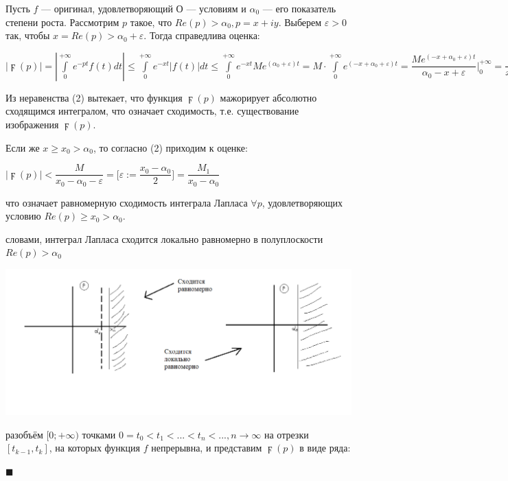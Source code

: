 \documentclass[a4paper, 12pt]{report}
\newenvironment{Proof}
{\par\noindent{\bf Доказательство.}}
{\hfill$\scriptstyle\blacksquare$}
\begin{document}
\begin{Proof}
    Пусть $f$ --- оригинал, удовлетворяющий О --- условиям и $\alpha_0$ --- его показатель степени роста. Рассмотрим $p$ такое, что $Re(p) > \alpha_0, p = x + iy$. Выберем $\varepsilon > 0$ так, чтобы $x = Re(p) > \alpha_0 + \varepsilon$. Тогда справедлива оценка:

$|\digamma(p)| = |\int\limits_0^{+\infty} e^{-pt}f(t)dt| \leq \int\limits_0^{+\infty} e^{-xt}|f(t)|dt \leq \int\limits_0^{+\infty} e^{-xt}Me^{(\alpha_0 + \varepsilon)t} = M\cdot\int\limits_0^{+\infty} e^{(-x + \alpha_0 + \varepsilon)t} = \dfrac{Me^{(-x + \alpha_0 + \varepsilon)t}}{\alpha_0 - x + \varepsilon}\Bigr|_0^{+\infty} = \dfrac{M}{x - \alpha_0 - \varepsilon} (2)$
\par\bigskip
Из неравенства (2) вытекает, что функция $\digamma(p)$ мажорирует абсолютно сходящимся интегралом, что означает сходимость, т.е. существование изображения $\digamma(p)$.

Если же $x \geq x_0 > \alpha_0$, то согласно (2) приходим к оценке:

\begin{center}
    $|\digamma(p)| < \dfrac{M}{x_0 - \alpha_0 - \varepsilon} = \Bigr[ \varepsilon := \dfrac{x_0 - \alpha_0}{2} \Bigr] = \dfrac{M_1}{x_0 - \alpha_0}$
\end{center}

что означает равномерную сходимость интеграла Лапласа $\forall p$, удовлетворяющих условию $Re(p) \geq x_0 > \alpha_0$.

\par{} словами, интеграл Лапласа сходится локально равномерно в полуплоскости $Re(p) > \alpha_0$

\begin{center}
    \includegraphics[width=13 cm]{original/shodimost.png}
\end{center}
 разобъём $[0; +\infty)$ точками $0 = t_0 < t_1 < ... < t_n < ..., n \rightarrow \infty$ на отрезки $[t_{k-1}, t_k]$, на которых функция $f$ непрерывна, и представим $\digamma(p)$ в виде ряда:


\end{Proof}
\end{document}
